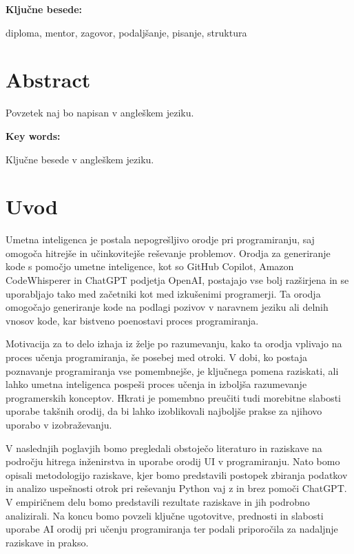 \documentclass[12pt,a4paper]{book}
\begin{document}
\vspace{1.3cm}
\noindent
{\large \bf Ključne besede:}

\vspace{0.5cm}
\noindent
diploma, mentor, zagovor, podaljšanje, pisanje, struktura


\chapter*{Abstract}


Povzetek naj bo napisan v angleškem jeziku.

\vspace{1.3cm}
\noindent
{\large \bf Key words:}

\vspace{0.5cm}
\noindent
Ključne besede v angleškem jeziku.



\chapter{Uvod}

Umetna inteligenca je postala nepogrešljivo orodje pri programiranju, saj omogoča hitrejše in učinkovitejše reševanje problemov. Orodja za generiranje kode s pomočjo umetne inteligence, kot so GitHub Copilot, Amazon CodeWhisperer in ChatGPT podjetja OpenAI, postajajo vse bolj razširjena in se uporabljajo tako med začetniki kot med izkušenimi programerji. Ta orodja omogočajo generiranje kode na podlagi pozivov v naravnem jeziku ali delnih vnosov kode, kar bistveno poenostavi proces programiranja.

Motivacija za to delo izhaja iz želje po razumevanju, kako ta orodja vplivajo na proces učenja programiranja, še posebej med otroki. V dobi, ko postaja poznavanje programiranja vse pomembnejše, je ključnega pomena raziskati, ali lahko umetna inteligenca pospeši proces učenja in izboljša razumevanje programerskih konceptov. Hkrati je pomembno preučiti tudi morebitne slabosti uporabe takšnih orodij, da bi lahko izoblikovali najboljše prakse za njihovo uporabo v izobraževanju.

V naslednjih poglavjih bomo pregledali obstoječo literaturo in raziskave na področju hitrega inženirstva in uporabe orodij UI v programiranju. Nato bomo opisali metodologijo raziskave, kjer bomo predstavili postopek zbiranja podatkov in analizo uspešnosti otrok pri reševanju Python vaj z in brez pomoči ChatGPT. V empiričnem delu bomo predstavili rezultate raziskave in jih podrobno analizirali. Na koncu bomo povzeli ključne ugotovitve, prednosti in slabosti uporabe AI orodij pri učenju programiranja ter podali priporočila za nadaljnje raziskave in prakso.
\end{document}
